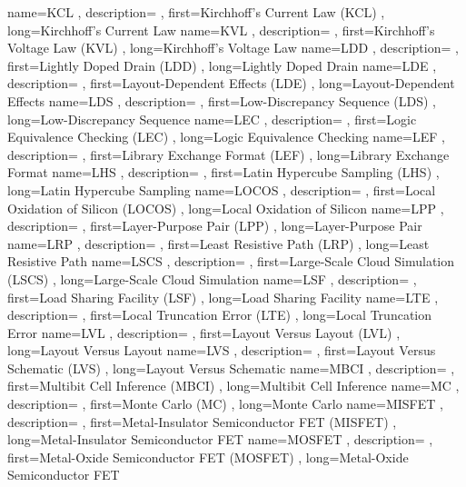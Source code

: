 { name={KCL}
, description={}
, first={Kirchhoff’s Current Law (KCL)}
, long={Kirchhoff’s Current Law}
}
{ name={KVL}
, description={}
, first={Kirchhoff’s Voltage Law (KVL)}
, long={Kirchhoff’s Voltage Law}
}
{ name={LDD}
, description={}
, first={Lightly Doped Drain (LDD)}
, long={Lightly Doped Drain}
}
{ name={LDE}
, description={}
, first={Layout-Dependent Effects (LDE)}
, long={Layout-Dependent Effects}
}
{ name={LDS}
, description={}
, first={Low-Discrepancy Sequence (LDS)}
, long={Low-Discrepancy Sequence}
}
{ name={LEC}
, description={}
, first={Logic Equivalence Checking (LEC)}
, long={Logic Equivalence Checking}
}
{ name={LEF}
, description={}
, first={Library Exchange Format (LEF)}
, long={Library Exchange Format}
}
{ name={LHS}
, description={}
, first={Latin Hypercube Sampling (LHS)}
, long={Latin Hypercube Sampling}
}
{ name={LOCOS}
, description={}
, first={Local Oxidation of Silicon (LOCOS)}
, long={Local Oxidation of Silicon}
}
{ name={LPP}
, description={}
, first={Layer-Purpose Pair (LPP)}
, long={Layer-Purpose Pair}
}
{ name={LRP}
, description={}
, first={Least Resistive Path (LRP)}
, long={Least Resistive Path}
}
{ name={LSCS}
, description={}
, first={Large-Scale Cloud Simulation (LSCS)}
, long={Large-Scale Cloud Simulation}
}
{ name={LSF}
, description={}
, first={Load Sharing Facility (LSF)}
, long={Load Sharing Facility}
}
{ name={LTE}
, description={}
, first={Local Truncation Error (LTE)}
, long={Local Truncation Error}
}
{ name={LVL}
, description={}
, first={Layout Versus Layout (LVL)}
, long={Layout Versus Layout}
}
{ name={LVS}
, description={}
, first={Layout Versus Schematic (LVS)}
, long={Layout Versus Schematic}
}
{ name={MBCI}
, description={}
, first={Multibit Cell Inference (MBCI)}
, long={Multibit Cell Inference}
}
{ name={MC}
, description={}
, first={Monte Carlo (MC)}
, long={Monte Carlo}
}
{ name={MISFET}
, description={}
, first={Metal-Insulator Semiconductor FET (MISFET)}
, long={Metal-Insulator Semiconductor FET}
}
{ name={MOSFET}
, description={}
, first={Metal-Oxide Semiconductor FET (MOSFET)}
, long={Metal-Oxide Semiconductor FET}
}
